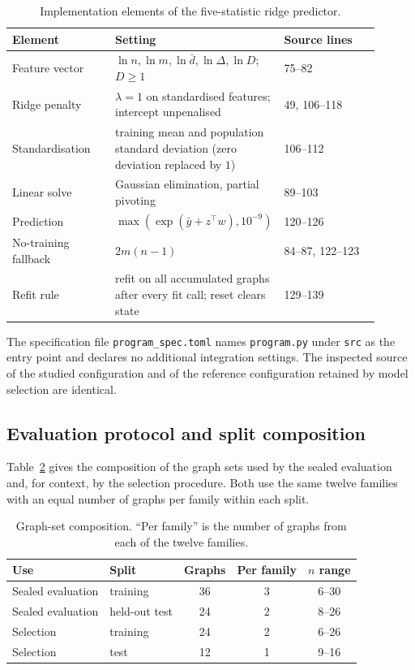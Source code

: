 \documentclass{article}
\begin{document}
\begin{table}[h]
\centering
\caption{Implementation elements of the five-statistic ridge predictor.}
\label{tab:impl}
\small
\begin{tabular}{p{0.28\linewidth}p{0.36\linewidth}p{0.26\linewidth}}
\toprule
Element & Setting & Source lines \\
\midrule
Feature vector & $\ln n,\ln m,\ln\bar d,\ln\Delta,\ln D$; $D\ge1$ & 75--82 \\
Ridge penalty & $\lambda=1$ on standardised features; intercept unpenalised & 49, 106--118 \\
Standardisation & training mean and population standard deviation (zero deviation replaced by $1$) & 106--112 \\
Linear solve & Gaussian elimination, partial pivoting & 89--103 \\
Prediction & $\max(\exp(\bar y+z^\top w),10^{-9})$ & 120--126 \\
No-training fallback & $2m(n-1)$ & 84--87, 122--123 \\
Refit rule & refit on all accumulated graphs after every fit call; reset clears state & 129--139 \\
\bottomrule
\end{tabular}
\end{table}

The specification file \texttt{program\_spec.toml} names \texttt{program.py} under \texttt{src} as the entry point and declares no additional integration settings. The inspected source of the studied configuration and of the reference configuration retained by model selection are identical.

\subsection{Evaluation protocol and split composition}
Table~\ref{tab:splits} gives the composition of the graph sets used by the sealed evaluation and, for context, by the selection procedure. %
Both use the same twelve families with an equal number of graphs per family within each split.

\begin{table}[h]
\centering
\caption{Graph-set composition. ``Per family'' is the number of graphs from each of the twelve families.}
\label{tab:splits}
\small
\begin{tabular}{llccc}
\toprule
Use & Split & Graphs & Per family & $n$ range \\
\midrule
Sealed evaluation & training & 36 & 3 & 6--30 \\
Sealed evaluation & held-out test & 24 & 2 & 8--26 \\
Selection & training & 24 & 2 & 6--26 \\
Selection & test & 12 & 1 & 9--16 \\
\bottomrule
\end{tabular}
\end{table}
\end{document}
